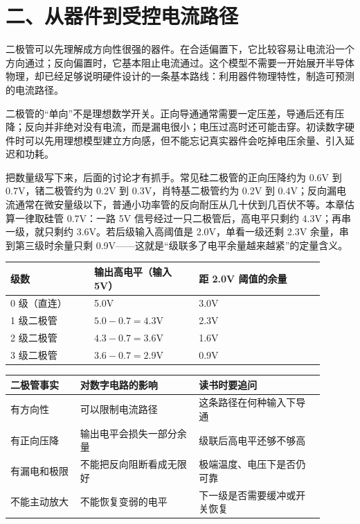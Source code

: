 \section{二、从器件到受控电流路径}

二极管可以先理解成方向性很强的器件。在合适偏置下，它比较容易让电流沿一个方向通过；反向偏置时，它基本阻止电流通过。这个模型不需要一开始展开半导体物理，却已经足够说明硬件设计的一条基本路线：利用器件物理特性，制造可预测的电流路径。

二极管的“单向”不是理想数学开关。正向导通通常需要一定压差，导通后还有压降；反向并非绝对没有电流，而是漏电很小；电压过高时还可能击穿。初读数字硬件时可以先用理想模型建立方向感，但不能忘记真实器件会吃掉电压余量、引入延迟和功耗。

把数量级写下来，后面的讨论才有抓手。常见硅二极管的正向压降约为 0.6V 到 0.7V，锗二极管约为 0.2V 到 0.3V，肖特基二极管约为 0.2V 到 0.4V；反向漏电流通常在微安量级以下，普通小功率管的反向耐压从几十伏到几百伏不等。本章估算一律取硅管 0.7V：一路 5V 信号经过一只二极管后，高电平只剩约 4.3V；再串一级，就只剩约 3.6V。若后级输入高阈值是 2.0V，单看一级还剩 2.3V 余量，串到第三级时余量只剩 0.9V——这就是“级联多了电平余量越来越紧”的定量含义。

\begin{longtable}{L{0.24\linewidth}L{0.3\linewidth}L{0.36\linewidth}}
\toprule
级数 & 输出高电平（输入 5V） & 距 2.0V 阈值的余量 \\
 级（直连） & 5.0V & 3.0V \\
1 级二极管 & $5.0-0.7=4.3$V & 2.3V \\
2 级二极管 & $4.3-0.7=3.6$V & 1.6V \\
3 级二极管 & $3.6-0.7=2.9$V & 0.9V \\
\bottomrule
\end{longtable}

\begin{longtable}{L{0.2\linewidth}L{0.34\linewidth}L{0.36\linewidth}}
\toprule
二极管事实 & 对数字电路的影响 & 读书时要追问 \\
\midrule
有方向性 & 可以限制电流路径 & 这条路径在何种输入下导通 \\
有正向压降 & 输出电平会损失一部分余量 & 级联后高电平还够不够高 \\
有漏电和极限 & 不能把反向阻断看成无限好 & 极端温度、电压下是否仍可靠 \\
不能主动放大 & 不能恢复变弱的电平 & 下一级是否需要缓冲或开关恢复 \\
\bottomrule
\end{longtable}

